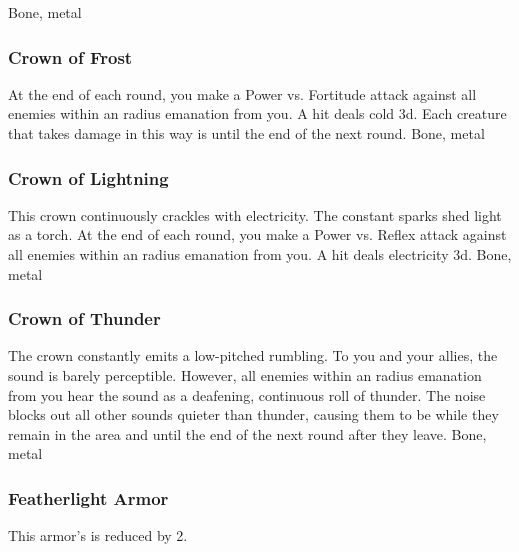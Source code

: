  Bone, metal
\lowercase{\hypertarget{item:Crown of Frost}{}}\label{item:Crown of Frost}
\hypertarget{item:Crown of Frost}{\subsubsection{Crown of Frost\hfill{}}}
At the end of each round, you make a Power vs. Fortitude attack against all enemies within an \areamed radius emanation from you.
A hit deals cold  \minus3d.
Each creature that takes damage in this way is \fatigued until the end of the next round.
 
 Bone, metal
\lowercase{\hypertarget{item:Crown of Lightning}{}}\label{item:Crown of Lightning}
\hypertarget{item:Crown of Lightning}{\subsubsection{Crown of Lightning\hfill{}}}
This crown continuously crackles with electricity.
The constant sparks shed light as a torch.
At the end of each round, you make a Power vs. Reflex attack against all enemies within an \areamed radius emanation from you.
A hit deals electricity  \minus3d.
 
 Bone, metal
\lowercase{\hypertarget{item:Crown of Thunder}{}}\label{item:Crown of Thunder}
\hypertarget{item:Crown of Thunder}{\subsubsection{Crown of Thunder\hfill{}}}
The crown constantly emits a low-pitched rumbling.
To you and your allies, the sound is barely perceptible.
However, all enemies within an \arealarge radius emanation from you hear the sound as a deafening, continuous roll of thunder.
The noise blocks out all other sounds quieter than thunder, causing them to be \deafened while they remain in the area and until the end of the next round after they leave.
 
 Bone, metal
\lowercase{\hypertarget{item:Featherlight Armor}{}}\label{item:Featherlight Armor}
\hypertarget{item:Featherlight Armor}{\subsubsection{Featherlight Armor\hfill{}}}
This armor's  is reduced by 2.
 
